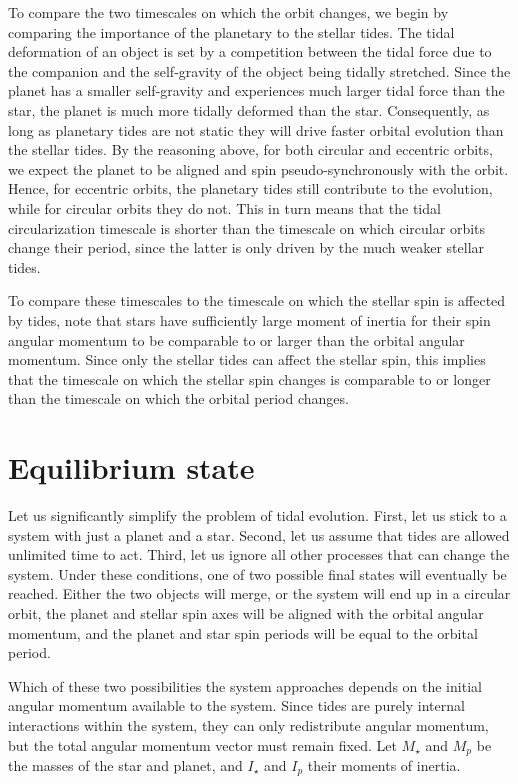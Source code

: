To compare the two timescales on which the orbit changes, we begin by comparing
the importance of the planetary to the stellar tides. The tidal deformation of
an object is set by a competition between the tidal force due to the companion
and the self-gravity of the object being tidally stretched. Since the planet has
a smaller self-gravity and experiences much larger tidal force than the star,
the planet is much more tidally deformed than the star. Consequently, as long as
planetary tides are not static they will drive faster orbital evolution than the
stellar tides. By the reasoning above, for both circular and eccentric orbits,
we expect the planet to be aligned and spin pseudo-synchronously with the orbit.
Hence, for eccentric orbits, the planetary tides still contribute to the
evolution, while for circular orbits they do not. This in turn means that the
tidal circularization timescale is shorter than the timescale on which circular
orbits change their period, since the latter is only driven by the much weaker
stellar tides.

To compare these timescales to the timescale on which the stellar spin is
affected by tides, note that stars have sufficiently large moment of inertia
for their spin angular momentum to be comparable to or larger than the orbital
angular momentum. Since only the stellar tides can affect the stellar spin, this
implies that the timescale on which the stellar spin changes is comparable to or
longer than the timescale on which the orbital period changes.

\section{Equilibrium state}

Let us significantly simplify the problem of tidal evolution. First, let us
stick to a system with just a planet and a star. Second, let us assume that
tides are allowed unlimited time to act. Third, let us ignore all other
processes that can change the system. Under these conditions, one of two
possible final states will eventually be reached. Either the two objects will
merge, or the system will end up in a circular orbit, the planet and stellar
spin axes will be aligned with the orbital angular momentum, and the planet and
star spin periods will be equal to the orbital period.

Which of these two possibilities the system approaches depends on the initial
angular momentum available to the system. Since tides are purely internal
interactions within the system, they can only redistribute angular momentum, but
the total angular momentum vector must remain fixed. Let $M_\star$ and $M_p$ be
the masses of the star and planet, and $I_\star$ and $I_p$ their moments of
inertia.

